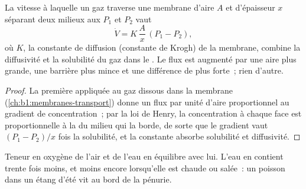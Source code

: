 \begin{theorem}\label{thm:b1:gas-exchange:fick}
La vitesse à laquelle un gaz traverse une membrane d'aire $A$ et
d'épaisseur $x$ séparant deux milieux aux  $P_1$ et $P_2$ vaut
\[
\dot V = K\,\frac{A}{x}\,(P_1 - P_2),
\]
où $K$, la constante de diffusion (constante de Krogh) de la membrane,
combine la diffusivité et la solubilité du gaz dans le . Le flux
est augmenté par une aire plus grande, une barrière plus mince et une
différence de  plus forte~; rien d'autre.
\end{theorem}
\begin{proof}
La première  appliquée au gaz dissous dans la membrane
(\cref{ch:b1:membranes-transport}) donne un flux par unité d'aire
proportionnel au gradient de concentration~; par la loi de Henry, la
concentration à chaque face est proportionnelle à la  du milieu qui la borde, de sorte que le gradient vaut
$(P_1 - P_2)/x$ fois la solubilité, et la constante absorbe
solubilité et diffusivité.
\end{proof}

\begin{omfigure}

{\small Teneur en oxygène de l'air et de l'eau en équilibre avec lui.
L'eau en contient trente fois moins, et moins encore lorsqu'elle est
chaude ou salée~: un poisson dans un étang d'été vit au bord de la
pénurie.}
\end{omfigure}

